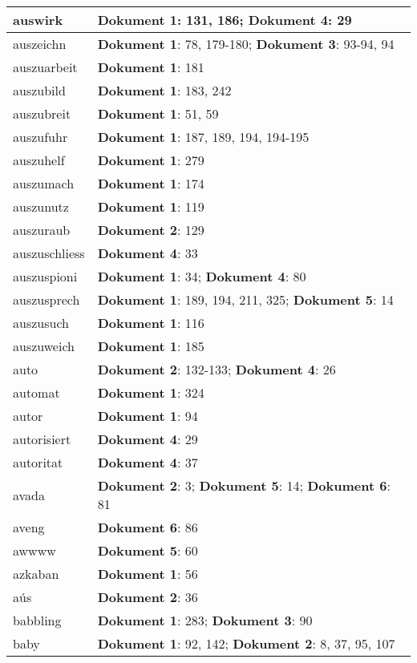 \documentclass[a5paper]{article}
\begin{document}
\begin{longtable}[l]{|l|p{3in}|}
\hline
auswirk & \textbf{Dokument 1}: 131, 186; \textbf{Dokument 4}: 29 \\
\hline
auszeichn & \textbf{Dokument 1}: 78, 179-180; \textbf{Dokument 3}: 93-94, 94 \\
\hline
auszuarbeit & \textbf{Dokument 1}: 181 \\
\hline
auszubild & \textbf{Dokument 1}: 183, 242 \\
\hline
auszubreit & \textbf{Dokument 1}: 51, 59 \\
\hline
auszufuhr & \textbf{Dokument 1}: 187, 189, 194, 194-195 \\
\hline
auszuhelf & \textbf{Dokument 1}: 279 \\
\hline
auszumach & \textbf{Dokument 1}: 174 \\
\hline
auszunutz & \textbf{Dokument 1}: 119 \\
\hline
auszuraub & \textbf{Dokument 2}: 129 \\
\hline
auszuschliess & \textbf{Dokument 4}: 33 \\
\hline
auszuspioni & \textbf{Dokument 1}: 34; \textbf{Dokument 4}: 80 \\
\hline
auszusprech & \textbf{Dokument 1}: 189, 194, 211, 325; \textbf{Dokument 5}: 14 \\
\hline
auszusuch & \textbf{Dokument 1}: 116 \\
\hline
auszuweich & \textbf{Dokument 1}: 185 \\
\hline
auto & \textbf{Dokument 2}: 132-133; \textbf{Dokument 4}: 26 \\
\hline
automat & \textbf{Dokument 1}: 324 \\
\hline
autor & \textbf{Dokument 1}: 94 \\
\hline
autorisiert & \textbf{Dokument 4}: 29 \\
\hline
autoritat & \textbf{Dokument 4}: 37 \\
\hline
avada & \textbf{Dokument 2}: 3; \textbf{Dokument 5}: 14; \textbf{Dokument 6}: 81 \\
\hline
aveng & \textbf{Dokument 6}: 86 \\
\hline
awwww & \textbf{Dokument 5}: 60 \\
\hline
azkaban & \textbf{Dokument 1}: 56 \\
\hline
aús & \textbf{Dokument 2}: 36 \\
\hline
babbling & \textbf{Dokument 1}: 283; \textbf{Dokument 3}: 90 \\
\hline
baby & \textbf{Dokument 1}: 92, 142; \textbf{Dokument 2}: 8, 37, 95, 107 \\

\end{longtable}
\end{document}
